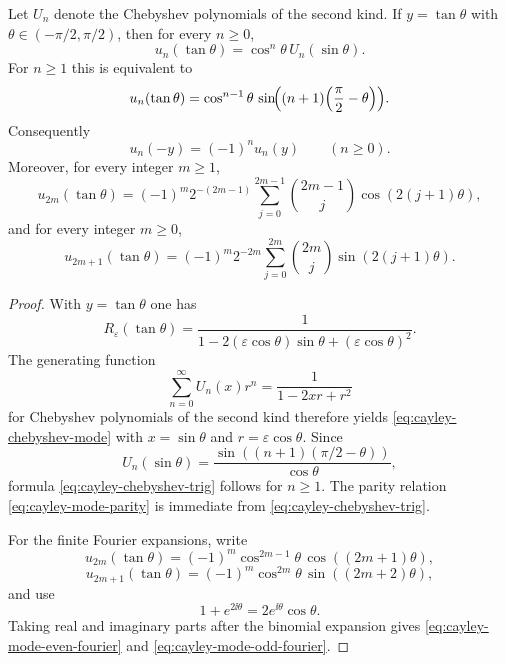 \begin{theorem}%
\label{thm:cayley-chebyshev-mode}
Let $U_n$ denote the Chebyshev polynomials of the second kind.  If
$y=\tan\theta$ with $\theta\in(-\pi/2,\pi/2)$, then for every $n\ge 0$,
\begin{equation}\label{eq:cayley-chebyshev-mode}
u_n(\tan\theta)=\cos^n\theta\,U_n(\sin\theta).
\end{equation}
For $n\ge 1$ this is equivalent to
\begin{equation}\label{eq:cayley-chebyshev-trig}
u_n(\tan\theta)
=\cos^{n-1}\theta\,
\sin\!\Bigl((n+1)\Bigl(\frac{\pi}{2}-\theta\Bigr)\Bigr).
\end{equation}
Consequently
\begin{equation}\label{eq:cayley-mode-parity}
u_n(-y)=(-1)^n u_n(y)
\qquad(n\ge 0).
\end{equation}
Moreover, for every integer $m\ge 1$,
\begin{equation}\label{eq:cayley-mode-even-fourier}
u_{2m}(\tan\theta)
=(-1)^m 2^{-(2m-1)}
\sum_{j=0}^{2m-1}\binom{2m-1}{j}\cos(2(j+1)\theta),
\end{equation}
and for every integer $m\ge 0$,
\begin{equation}\label{eq:cayley-mode-odd-fourier}
u_{2m+1}(\tan\theta)
=(-1)^m 2^{-2m}
\sum_{j=0}^{2m}\binom{2m}{j}\sin(2(j+1)\theta).
\end{equation}
\end{theorem}

\begin{proof}
With $y=\tan\theta$ one has
\[
R_\varepsilon(\tan\theta)
=\frac{1}{1-2(\varepsilon\cos\theta)\sin\theta+(\varepsilon\cos\theta)^2}.
\]
The generating function
\[
\sum_{n=0}^{\infty}U_n(x)r^n=\frac{1}{1-2xr+r^2}
\]
for Chebyshev polynomials of the second kind
\cite[Chapter~5]{MasonHandscomb2002} therefore yields
\eqref{eq:cayley-chebyshev-mode} with
$x=\sin\theta$ and $r=\varepsilon\cos\theta$.  Since
\[
U_n(\sin\theta)
=\frac{\sin((n+1)(\pi/2-\theta))}{\cos\theta},
\]
formula \eqref{eq:cayley-chebyshev-trig} follows for $n\ge 1$.  The
parity relation \eqref{eq:cayley-mode-parity} is immediate from
\eqref{eq:cayley-chebyshev-trig}.

For the finite Fourier expansions, write
\[
u_{2m}(\tan\theta)=(-1)^m\cos^{2m-1}\theta\,\cos((2m+1)\theta),
\]
\[
u_{2m+1}(\tan\theta)=(-1)^m\cos^{2m}\theta\,\sin((2m+2)\theta),
\]
and use
\[
1+e^{2\ii\theta}=2e^{\ii\theta}\cos\theta.
\]
Taking real and imaginary parts after the binomial expansion gives
\eqref{eq:cayley-mode-even-fourier} and
\eqref{eq:cayley-mode-odd-fourier}.
\end{proof}

